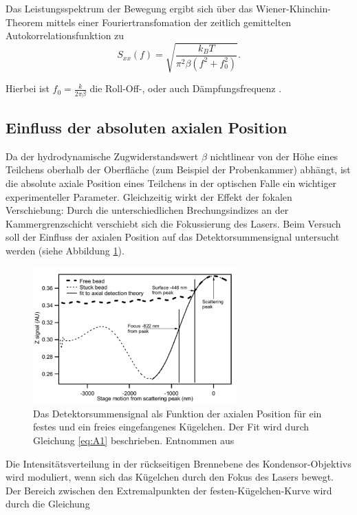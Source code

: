 Das Leistungsspektrum der Bewegung ergibt sich über das
Wiener-Khinchin-Theorem mittels einer Fouriertransfomation der zeitlich gemittelten Autokorrelationsfunktion zu
\begin{equation}
    S_{xx}(f)=\sqrt{\frac{k_B T}{\pi^2 \beta (f^2+f_0^2)}}.
\end{equation}

Hierbei ist $f_0 = \frac{k}{2 \pi \beta}$ die Roll-Off-, oder auch Dämpfungsfrequenz .
\subsection{Einfluss der absoluten axialen Position}
Da der hydrodynamische Zugwiderstandswert $\beta$ nichtlinear von der Höhe 
eines Teilchens oberhalb der Oberfläche (zum Beispiel der Probenkammer) abhängt, 
ist die absolute axiale Position eines Teilchens in der optischen Falle ein wichtiger experimenteller Parameter.
Gleichzeitig wirkt der Effekt der fokalen Verschiebung: Durch die unterschiedlichen Brechungsindizes an der Kammergrenzschicht verschiebt sich die Fokussierung des Lasers.
Beim Versuch soll der Einfluss der axialen Position auf das Detektorsummensignal untersucht werden (siehe Abbildung \ref{fig:fokal}).

\begin{figure}[H]
    \centering\captionsetup{format=plain}
    \includegraphics[width=0.7\textwidth]{Bilder/OP_Fokal.png}
    \caption{Das Detektorsummensignal als Funktion der axialen Position für ein festes und ein freies eingefangenes Kügelchen. Der Fit wird durch Gleichung \ref{eq:A1} beschrieben. Entnommen aus \cite{anleitung}}
    \label{fig:fokal}
\end{figure}
Die Intensitätsverteilung in der rückseitigen Brennebene des Kondensor-Objektivs 
wird moduliert, wenn sich das Kügelchen durch den Fokus des Lasers bewegt.
Der Bereich zwischen den
Extremalpunkten der festen-Kügelchen-Kurve wird durch die Gleichung

